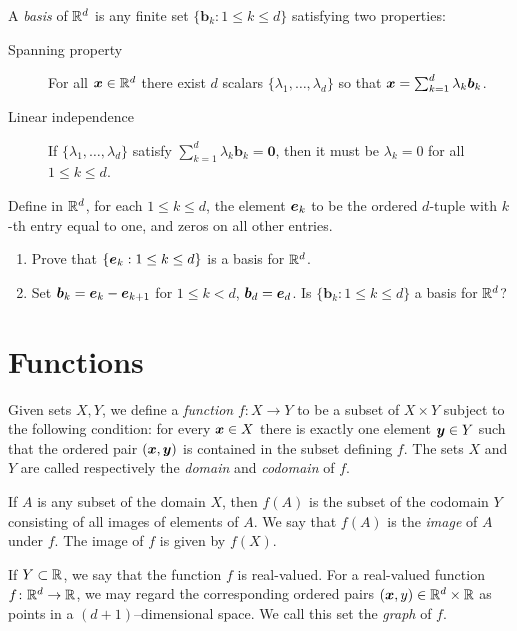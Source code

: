 A \emph{basis} of $\mathbb{R}^d$ is any finite set $\{ \boldsymbol{b}_k : 1\leq k \leq d \}$ satisfying two properties:
\begin{description}
\item [Spanning property] For all $\boldsymbol{x} \in \mathbb{R}^d$ there exist $d$ scalars $\{ \lambda_1, \dotsc, \lambda_d \}$ so that $\boldsymbol{x} = \sum_{k=1}^d \lambda_k \boldsymbol{b}_k$.
\item [Linear independence] If $\{ \lambda_1, \dotsc, \lambda_d\}$ satisfy $\sum_{k=1}^d \lambda_k \boldsymbol{b}_k = \boldsymbol{0}$, then it must be $\lambda_k=0$ for all $1\leq k \leq d$.
\end{description}

\begin{problem}\label{problem:basisRd}
Define in $\mathbb{R}^d$, for each $1\leq k \leq d$, the element $\boldsymbol{e}_k$ to be the ordered $d$-tuple with $k$-th entry equal to one, and zeros on all other entries.
\begin{enumerate}
	\item Prove that $\{ \boldsymbol{e}_k : 1\leq k \leq d\}$ is a basis for $\mathbb{R}^d$.
	\item Set $\boldsymbol{b}_k = \boldsymbol{e}_k - \boldsymbol{e}_{k+1}$ for $1\leq k < d$, $\boldsymbol{b}_d = \boldsymbol{e}_d$.  Is $\{ \boldsymbol{b}_k : 1\leq k \leq d\}$ a basis for $\mathbb{R}^d$?
\end{enumerate}
\end{problem}

\section{Functions}

Given sets $X, Y$, we define a \emph{function} $f\colon X \to Y$ to be a subset of $X \times Y$ subject to the following condition: for every $\boldsymbol{x} \in X$ there is exactly one element $\boldsymbol{y} \in Y$ such that the ordered pair $(\boldsymbol{x}, \boldsymbol{y})$ is contained in the subset defining $f$. The sets $X$ and $Y$ are called respectively the \emph{domain} and \emph{codomain} of $f$.  

If $A$ is any subset of the domain $X$, then $f(A)$ is the subset of the codomain $Y$ consisting of all images of elements of $A$. We say that $f(A)$ is the \emph{image} of $A$ under $f$. The image of $f$ is given by $f(X)$.  

If $Y \subset \mathbb{R}$, we say that the function $f$ is real-valued.  For a real-valued function $f\colon \mathbb{R}^d \to \mathbb{R}$, we may regard the corresponding ordered pairs $(\boldsymbol{x}, y) \in \mathbb{R}^d\times\mathbb{R}$ as points in a $(d+1)$--dimensional space.  We call this set the \emph{graph} of $f$.

